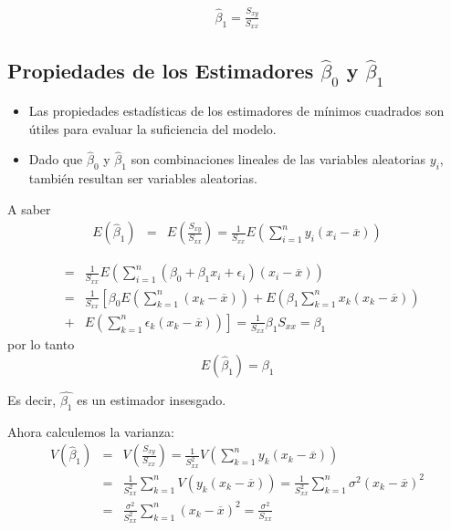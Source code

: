 \begin{itemize}
\begin{enumerate}
\begin{eqnarray}
\hat{\beta}_{1}=\frac{S_{xy}}{S_{xx}}
\end{eqnarray}
\subsection*{Propiedades de los Estimadores $\hat{\beta}_{0}$ y $\hat{\beta}_{1}$}
\begin{itemize}
\item Las propiedades estad\'isticas de los estimadores de m\'inimos cuadrados son \'utiles para evaluar la suficiencia del modelo.

\item Dado que $\hat{\beta}_{0}$ y  $\hat{\beta}_{1}$ son combinaciones lineales de las variables aleatorias $y_{i}$, tambi\'en resultan ser variables aleatorias.
\end{itemize}

A saber
\begin{eqnarray*}
E\left(\hat{\beta}_{1}\right)&=&E\left(\frac{S_{xy}}{S_{xx}}\right)=\frac{1}{S_{xx}}E\left(\sum_{i=1}^{n}y_{i}\left(x_{i}-\overline{x}\right)\right)
\end{eqnarray*}

\begin{eqnarray*}
&=&\frac{1}{S_{xx}}E\left(\sum_{i=1}^{n}\left(\beta_{0}+\beta_{1}x_{i}+\epsilon_{i}\right)\left(x_{i}-\overline{x}\right)\right)\\
&=&\frac{1}{S_{xx}}\left[\beta_{0}E\left(\sum_{k=1}^{n}\left(x_{k}-\overline{x}\right)\right)+E\left(\beta_{1}\sum_{k=1}^{n}x_{k}\left(x_{k}-\overline{x}\right)\right)\right.\\
&+&\left.E\left(\sum_{k=1}^{n}\epsilon_{k}\left(x_{k}-\overline{x}\right)\right)\right]=\frac{1}{S_{xx}}\beta_{1}S_{xx}=\beta_{1}
\end{eqnarray*}
por lo tanto 
\begin{equation}\label{Esperanza.Beta.1}
E\left(\hat{\beta}_{1}\right)=\beta_{1}
\end{equation}

Es decir, $\hat{\beta_{1}}$ es un estimador insesgado.

Ahora calculemos la varianza:
\begin{eqnarray*}
V\left(\hat{\beta}_{1}\right)&=&V\left(\frac{S_{xy}}{S_{xx}}\right)=\frac{1}{S_{xx}^{2}}V\left(\sum_{k=1}^{n}y_{k}\left(x_{k}-\overline{x}\right)\right)\\
&=&\frac{1}{S_{xx}^{2}}\sum_{k=1}^{n}V\left(y_{k}\left(x_{k}-\overline{x}\right)\right)=\frac{1}{S_{xx}^{2}}\sum_{k=1}^{n}\sigma^{2}\left(x_{k}-\overline{x}\right)^{2}\\
&=&\frac{\sigma^{2}}{S_{xx}^{2}}\sum_{k=1}^{n}\left(x_{k}-\overline{x}\right)^{2}=\frac{\sigma^{2}}{S_{xx}}
\end{eqnarray*}


\end{enumerate}
\end{itemize}
